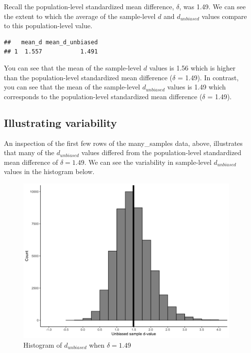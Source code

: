 \documentclass[
]{krantz}
\makeatletter
\newenvironment{Shaded}{\begin{snugshade}}{\end{snugshade}}
\newcommand{\DataTypeTok}[1]{\textcolor[rgb]{0.27,0.27,0.27}{#1}}
\newcommand{\KeywordTok}[1]{\textcolor[rgb]{0.27,0.27,0.27}{\textbf{#1}}}
\newcommand{\NormalTok}[1]{#1}
\newcommand{\OperatorTok}[1]{\textcolor[rgb]{0.43,0.43,0.43}{\textbf{#1}}}
\newcommand{\StringTok}[1]{\textcolor[rgb]{0.5,0.5,0.5}{#1}}
\newenvironment{kframe}{%
\medskip{}
\setlength{\fboxsep}{.8em}
 \def\at@end@of@kframe{}%
 \ifinner\ifhmode%
  \def\at@end@of@kframe{\end{minipage}}%
  \begin{minipage}{\columnwidth}%
 \fi\fi%
 \def\FrameCommand##1{\hskip\@totalleftmargin \hskip-\fboxsep
 \colorbox{shadecolor}{##1}\hskip-\fboxsep
     \hskip-\linewidth \hskip-\@totalleftmargin \hskip\columnwidth}%
 \MakeFramed {\advance\hsize-\width
   \@totalleftmargin\z@ \linewidth\hsize
   \@setminipage}}%
 {\par\unskip\endMakeFramed%
 \at@end@of@kframe}
\renewenvironment{Shaded}{\begin{kframe}}{\end{kframe}}
\makeatother
\begin{document}
Recall the population-level standardized mean difference, \(\delta\), was 1.49. We can see the extent to which the average of the sample-level \(d\) and \(d_{unbiased}\) values compare to this population-level value.

\begin{Shaded}
\end{Shaded}

\begin{verbatim}
##   mean_d mean_d_unbiased
## 1  1.557           1.491
\end{verbatim}

You can see that the mean of the sample-level \(d\) values is 1.56 which is higher than the population-level standardized mean difference (\(\delta\) = 1.49). In contrast, you can see that the mean of the sample-level \(d_{unbiased}\) values is 1.49 which corresponds to the population-level standardized mean difference (\(\delta\) = 1.49).

\hypertarget{illustrating-variability}{%
\subsection{Illustrating variability}\label{illustrating-variability}}

An inspection of the first few rows of the many\_samples data, above, illustrates that many of the \(d_{unbiased}\) values differed from the population-level standardized mean difference of \(\delta = 1.49\). We can see the variability in sample-level \(d_{unbiased}\) values in the histogram below.

\begin{figure}
\includegraphics[width=0.95\linewidth]{ch_samples/images/d_dist} \caption{Histogram of $d_{unbiased}$ when $\delta = 1.49$}\label{fig:ddist}
\end{figure}
\end{document}
